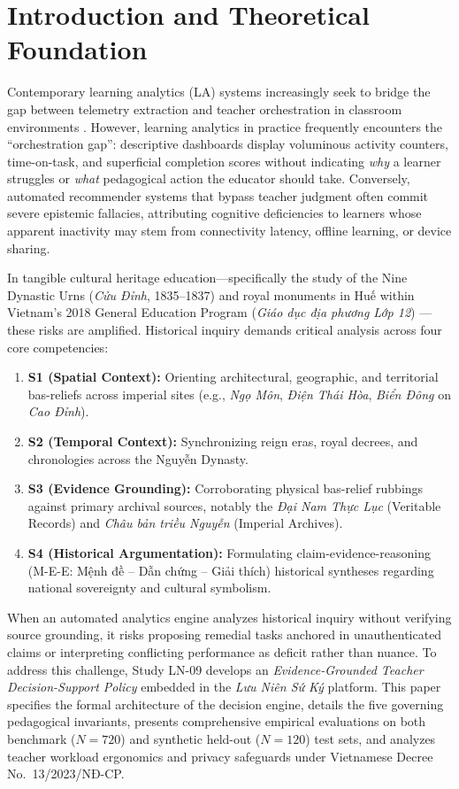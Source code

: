 \documentclass[11pt,a4paper]{article}
\begin{document}
\section{Introduction and Theoretical Foundation}
Contemporary learning analytics (LA) systems increasingly seek to bridge the gap between telemetry extraction and teacher orchestration in classroom environments \cite{vanleeuwen2021teacher,wise2021guiding,siemens2013learning,dillenbourg2013evolution}. However, learning analytics in practice frequently encounters the ``orchestration gap'': descriptive dashboards display voluminous activity counters, time-on-task, and superficial completion scores without indicating \textit{why} a learner struggles or \textit{what} pedagogical action the educator should take. Conversely, automated recommender systems that bypass teacher judgment often commit severe epistemic fallacies, attributing cognitive deficiencies to learners whose apparent inactivity may stem from connectivity latency, offline learning, or device sharing.

In tangible cultural heritage education—specifically the study of the Nine Dynastic Urns (\textit{Cửu Đỉnh}, 1835--1837) and royal monuments in Huế within Vietnam's 2018 General Education Program (\textit{Giáo dục địa phương Lớp 12}) \cite{moet2018gdpt}—these risks are amplified. Historical inquiry demands critical analysis across four core competencies:
\begin{enumerate}
    \item \textbf{S1 (Spatial Context):} Orienting architectural, geographic, and territorial bas-reliefs across imperial sites (e.g., \textit{Ngọ Môn}, \textit{Điện Thái Hòa}, \textit{Biển Đông} on \textit{Cao Đỉnh}).
    \item \textbf{S2 (Temporal Context):} Synchronizing reign eras, royal decrees, and chronologies across the Nguyễn Dynasty.
    \item \textbf{S3 (Evidence Grounding):} Corroborating physical bas-relief rubbings against primary archival sources, notably the \textit{Đại Nam Thực Lục} (Veritable Records) and \textit{Châu bản triều Nguyễn} (Imperial Archives).
    \item \textbf{S4 (Historical Argumentation):} Formulating claim-evidence-reasoning (M-E-E: Mệnh đề -- Dẫn chứng -- Giải thích) historical syntheses regarding national sovereignty and cultural symbolism.
\end{enumerate}

When an automated analytics engine analyzes historical inquiry without verifying source grounding, it risks proposing remedial tasks anchored in unauthenticated claims or interpreting conflicting performance as deficit rather than nuance. 
To address this challenge, Study LN-09 develops an \textit{Evidence-Grounded Teacher Decision-Support Policy} embedded in the \textit{Lưu Niên Sứ Ký} platform. This paper specifies the formal architecture of the decision engine, details the five governing pedagogical invariants, presents comprehensive empirical evaluations on both benchmark ($N=720$) and synthetic held-out ($N=120$) test sets, and analyzes teacher workload ergonomics and privacy safeguards under Vietnamese Decree No.~13/2023/NĐ-CP.
\end{document}
